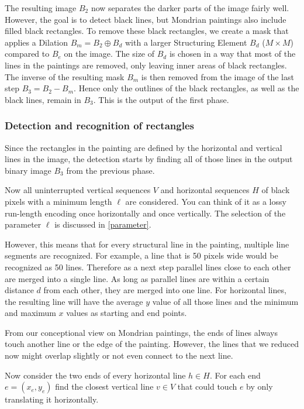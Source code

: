 \documentclass[serif,article,noparskip]{agse-thesis}
\begin{document}
The resulting image $B_2$ now separates the darker parts of the image fairly
well. However, the goal is to detect black lines, but Mondrian paintings also
include filled black rectangles. To remove these black rectangles, we create a
mask that applies a Dilation $B_m = B_2 \oplus B_d$ with a larger Structuring
Element $B_d$ ($M\times M$) compared to $B_e$ on the image. The size of $B_d$ is chosen in a
way that most of the lines in the paintings are removed, only leaving inner
areas of black rectangles. The inverse of the resulting mask $B_m$ is then
removed from the image of the last step $B_3 = B_2 - B_m$. Hence only the
outlines of the black rectangles, as well as the black lines, remain in $B_3$.
This is the output of the first phase.

\subsubsection{Detection and recognition of rectangles} \label{rectangles}

Since the rectangles in the painting are defined by the horizontal and
vertical lines in the image, the detection starts by finding all of those lines
in the output binary image $B_3$ from the previous phase.

Now all uninterrupted vertical sequences $V$ and horizontal sequences $H$ of
black pixels with a minimum length $\ell$ are considered. You can think of it as
a lossy run-length encoding once horizontally and once vertically. The selection
of the parameter $\ell$ is discussed in \ref{parameter}.

However, this means that for every structural line in the painting, multiple
line segments are recognized. For example, a line that is 50 pixels wide would
be recognized as 50 lines. Therefore as a next step parallel lines close to each
other are merged into a single line. As long as parallel lines are within a
certain distance $d$ from each other, they are merged into one line. For
horizontal lines, the resulting line will have the average $y$ value of all
those lines and the minimum and maximum $x$ values as starting and end points.

From our conceptional view on Mondrian paintings, the ends of lines always touch
another line or the edge of the painting. However, the lines that we reduced now
might overlap slightly or not even connect to the next line.

Now consider the two ends of every horizontal line $h \in H$. For each end $e =
(x_e,y_e)$ find the closest vertical line $v \in V$ that could touch $e$ by
only translating it horizontally.
\end{document}
